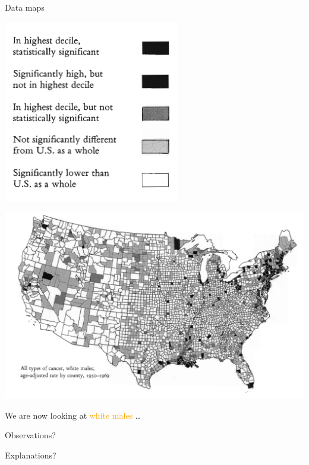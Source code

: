 \documentclass[
  ignorenonframetext,
]{beamer}
\begin{document}
\begin{frame}{Data maps}
\label{data-maps-2}
\begin{minipage}{0.3\textwidth}
\centering
\includegraphics[width=\textwidth]{excellence_figs/fig_9.png}
\end{minipage}
\hfill
\begin{minipage}{0.6\textwidth}
\centering
\includegraphics[width=\textwidth]{excellence_figs/fig_10.png}
\end{minipage}

We are now looking at \textcolor{orange}{white males} \ldots{}

Observations?

Explanations?
\end{frame}
\end{document}

